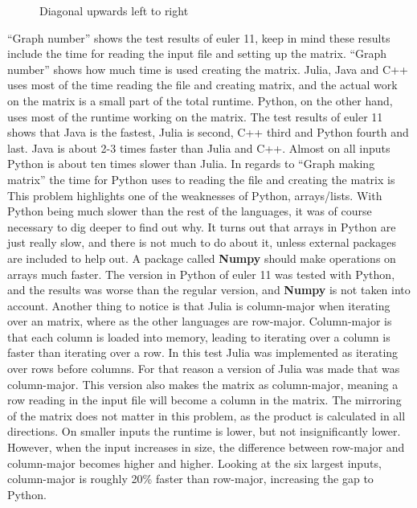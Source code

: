 \documentclass[a4paper, 11pt, titlepage]{article}
\begin{document}
\begin{figure}[H]
	\begin{center}
		
		\caption{Diagonal upwards left to right}
		\label{113}
	\end{center}
\end{figure}
“Graph number” shows the test results of euler 11, keep in mind these results include the time for reading the input file and setting up the matrix. “Graph number” shows how much time is used creating the matrix. Julia, Java and C++ uses most of the time reading the file and creating matrix, and the actual work on the matrix is a small part of the total runtime. Python, on the other hand, uses most of the runtime working on the matrix. The test results of euler 11 shows that Java is the fastest, Julia is second, C++ third and Python fourth and last. Java is about 2-3 times faster than Julia and C++. Almost on all inputs Python is about ten times slower than Julia. In regards to “Graph making matrix” the time for Python uses to reading the file and creating the matrix is  This problem highlights one of the weaknesses of Python, arrays/lists. With Python being much slower than the rest of the languages, it was of course necessary to dig deeper to find out why. It turns out that arrays in Python are just really slow, and there is not much to do about it, unless external packages are included to help out. A package called \textbf{Numpy} should make operations on arrays much faster. The version in Python of euler 11 was tested with Python, and the results was worse than the regular version, and \textbf{Numpy} is not taken into account. Another thing to notice is that Julia is column-major when iterating over an matrix, where as the other languages are row-major. Column-major is that each column is loaded into memory, leading to iterating over a column is faster than iterating over a row. In this test Julia was implemented as iterating over rows before columns. For that reason a version of Julia was made that was column-major. This version also makes the matrix as column-major, meaning a row reading in the input file will become a column in the matrix. The mirroring of the matrix does not matter in this problem, as the product is calculated in all directions. On smaller inputs the runtime is lower, but not insignificantly lower. However, when the input increases in size, the difference between row-major and column-major becomes higher and higher. Looking at the six largest inputs, column-major is roughly 20\% faster than row-major, increasing the gap to Python.
\end{document}
